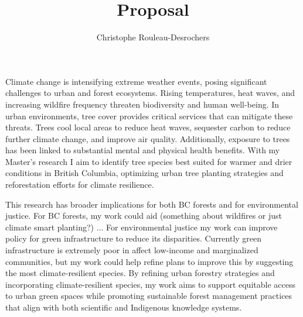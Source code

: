 \documentclass[11pt,letter]{article}
\title{Proposal}
\author{Christophe Rouleau-Desrochers}
\begin{document}

\maketitle

Climate change is intensifying extreme weather events, posing significant challenges to urban and forest ecosystems. Rising temperatures, heat waves, and increasing wildfire frequency threaten biodiversity and human well-being. In urban environments, tree cover provides critical services that can mitigate these threats. Trees cool local areas to reduce heat waves, sequester carbon to reduce further climate change, and improve air quality. Additionally, exposure to trees has been linked to substantial mental and physical health benefits. With my Master's research I aim to identify tree species best suited for warmer and drier conditions in British Columbia, optimizing urban tree planting strategies and reforestation efforts for climate resilience.


This research has broader implications for both BC forests and for environmental justice. For BC forests, my work could aid (something about wildfires or just climate smart planting?) ... For environmental justice my work can improve policy for green infrastructure to reduce its disparities. Currently green infrastructure is extremely poor in affect low-income and marginalized communities, but my work could help refine plans to improve this by suggesting the most climate-resilient species. By refining urban forestry strategies and incorporating climate-resilient species, my work aims to support equitable access to urban green spaces while promoting sustainable forest management practices that align with both scientific and Indigenous knowledge systems.
\end{document}
